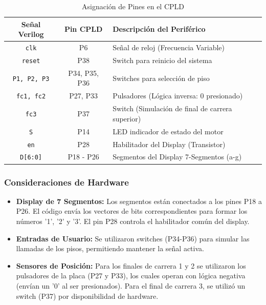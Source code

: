 \begin{table}[H]
\centering
\caption{Asignación de Pines en el CPLD}
\begin{tabular}{|c|c|l|}
\hline
\textbf{Señal Verilog} & \textbf{Pin CPLD} & \textbf{Descripción del Periférico} \\ \hline
\texttt{clk} & P6 & Señal de reloj (Frecuencia Variable) \\ \hline
\texttt{reset} & P38 & Switch para reinicio del sistema \\ \hline
\texttt{P1, P2, P3} & P34, P35, P36 & Switches para selección de piso \\ \hline
\texttt{fc1, fc2} & P27, P33 & Pulsadores (Lógica inversa: 0 presionado) \\ \hline
\texttt{fc3} & P37 & Switch (Simulación de final de carrera superior) \\ \hline
\texttt{S} & P14 & LED indicador de estado del motor \\ \hline
\texttt{en} & P28 & Habilitador del Display (Transistor) \\ \hline
\texttt{D[6:0]} & P18 - P26 & Segmentos del Display 7-Segmentos (a-g) \\ \hline
\end{tabular}
\label{tab:pines}
\end{table}


\subsubsection{Consideraciones de Hardware}
\begin{itemize}
    \item \textbf{Display de 7 Segmentos:} Los segmentos están conectados a los pines P18 a P26. El código envía los vectores de bits correspondientes para formar los números '1', '2' y '3'. El pin P28 controla el habilitador común del display.
    \item \textbf{Entradas de Usuario:} Se utilizaron switches (P34-P36) para simular las llamadas de los pisos, permitiendo mantener la señal activa.
    \item \textbf{Sensores de Posición:} Para los finales de carrera 1 y 2 se utilizaron los pulsadores de la placa (P27 y P33), los cuales operan con lógica negativa (envían un '0' al ser presionados). Para el final de carrera 3, se utilizó un switch (P37) por disponibilidad de hardware.
\end{itemize}
